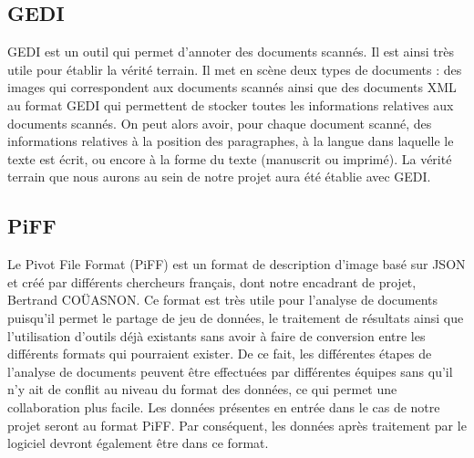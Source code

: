 \subsection{GEDI}

GEDI est un outil qui permet d’annoter des documents scannés. Il est ainsi très utile pour établir
la vérité terrain. Il met en scène deux types de documents : des images qui correspondent aux documents
scannés ainsi que des documents XML au format GEDI qui permettent de stocker toutes les informations
relatives aux documents scannés. On peut alors avoir, pour chaque document scanné, des informations
relatives à la position des paragraphes, à la langue dans laquelle le texte est écrit, ou encore à
la forme du texte (manuscrit ou imprimé). La vérité terrain que nous aurons au sein de notre projet
aura été établie avec GEDI.

\subsection{PiFF}

Le Pivot File Format (PiFF) est un format de description d’image basé sur JSON et créé par différents
chercheurs français, dont notre encadrant de projet, Bertrand COÜASNON. Ce format est très utile pour l’analyse
de documents puisqu'il permet le partage de jeu de données, le traitement de résultats ainsi que
l’utilisation d’outils déjà existants sans avoir à faire de conversion entre les différents formats
qui pourraient exister. De ce fait, les différentes étapes de l’analyse de documents peuvent être effectuées
par différentes équipes sans qu’il n'y ait de conflit au niveau du format des données, ce qui permet une
collaboration plus facile. Les données présentes en entrée dans le cas de notre projet seront au format PiFF.
Par conséquent, les données après traitement par le logiciel devront également être dans ce format.
